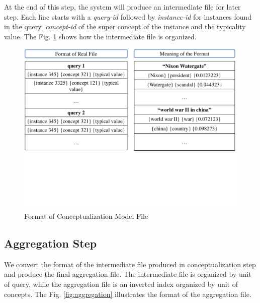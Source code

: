 At the end of this step, the system will produce an intermediate file for later step. Each line starts with a 
\textit{query-id} followed by \textit{instance-id} for instances found in the query, \textit{concept-id} of 
the super concept of the instance and the typicality value. The Fig. \ref{fig:conceptualization} shows how the 
intermediate file is organized.

\begin{figure}[h]
\centering
\includegraphics[scale=0.3]{images/conceptualization}
\caption{Format of Conceptualization Model File}
\label{fig:conceptualization}
\end{figure} 

\subsection{Aggregation Step}
We convert the format of the intermediate file produced in conceptualization step and produce the final aggregation 
file. The intermediate file is organized by unit of query, while the aggregation file is an inverted index organized 
by unit of concepts. The Fig. \ref{fig:aggregation} illustrates the format of the aggregation file.


